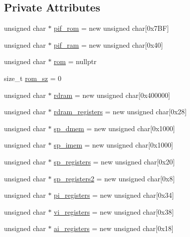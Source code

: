 \subsection*{Private Attributes}
\begin{DoxyCompactItemize}
\item 
unsigned char $\ast$ \hyperlink{classtms_1_1n64_1_1_m_m_u_a2460f43592ab08c9599ead3d61d5ea3f}{pif\+\_\+rom} = new unsigned char\mbox{[}0x7\+B\+F\mbox{]}
\item 
unsigned char $\ast$ \hyperlink{classtms_1_1n64_1_1_m_m_u_a39188c241ade87cc505bbc871e3fea19}{pif\+\_\+ram} = new unsigned char\mbox{[}0x40\mbox{]}
\item 
unsigned char $\ast$ \hyperlink{classtms_1_1n64_1_1_m_m_u_a9783f6a62389429f9ed792c8b5bffab4}{rom} = nullptr
\item 
size\+\_\+t \hyperlink{classtms_1_1n64_1_1_m_m_u_a76b3bcb73e77024d3df5fee75f52e0ce}{rom\+\_\+sz} = 0
\item 
unsigned char $\ast$ \hyperlink{classtms_1_1n64_1_1_m_m_u_a1ad4fd4211ec7202ea9371c1883d7d46}{rdram} = new unsigned char\mbox{[}0x400000\mbox{]}
\item 
unsigned char $\ast$ \hyperlink{classtms_1_1n64_1_1_m_m_u_aa94d063662ac8a78a5eacc0c292748bb}{rdram\+\_\+registers} = new unsigned char\mbox{[}0x28\mbox{]}
\item 
unsigned char $\ast$ \hyperlink{classtms_1_1n64_1_1_m_m_u_af8a6451af0f80b6c2cdf72025b46e50e}{sp\+\_\+dmem} = new unsigned char\mbox{[}0x1000\mbox{]}
\item 
unsigned char $\ast$ \hyperlink{classtms_1_1n64_1_1_m_m_u_ac137f18544ded7c088019ff6b5ba5866}{sp\+\_\+imem} = new unsigned char\mbox{[}0x1000\mbox{]}
\item 
unsigned char $\ast$ \hyperlink{classtms_1_1n64_1_1_m_m_u_af8be0f85ee89c8880e52f02e595c631b}{sp\+\_\+registers} = new unsigned char\mbox{[}0x20\mbox{]}
\item 
unsigned char $\ast$ \hyperlink{classtms_1_1n64_1_1_m_m_u_a4f331638ab723a74bba59bc678deed27}{sp\+\_\+registers2} = new unsigned char\mbox{[}0x8\mbox{]}
\item 
unsigned char $\ast$ \hyperlink{classtms_1_1n64_1_1_m_m_u_a9cff7716de3459ee491de07fab454d5c}{pi\+\_\+registers} = new unsigned char\mbox{[}0x34\mbox{]}
\item 
unsigned char $\ast$ \hyperlink{classtms_1_1n64_1_1_m_m_u_a0048e55306b8e0be8cb7046b975ee27c}{vi\+\_\+registers} = new unsigned char\mbox{[}0x38\mbox{]}
\item 
unsigned char $\ast$ \hyperlink{classtms_1_1n64_1_1_m_m_u_ad29b35b3f531cecc7b710c240695c922}{ai\+\_\+registers} = new unsigned char\mbox{[}0x18\mbox{]}

\end{DoxyCompactItemize}
